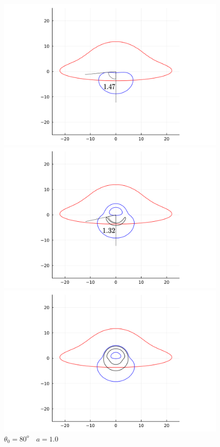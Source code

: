 \documentclass[dvipdfmx]{report} %
\begin{document}
\begin{figure}[H]
    \centering
    \begin{minipage}{0.49\textwidth}
        \centering
        \includegraphics[width=\textwidth]{./images//buch/80/80-0.5.png}
        \caption{$\theta_{0}=80^{o} \quad a=0.5$}
        \label{}
    \end{minipage}
    \begin{minipage}{0.49\textwidth}
        \centering
        \includegraphics[width=\textwidth]{./images//buch/80/80-1.0.png}
        \caption{$\theta_{0}=80^{o} \quad a=1.0$}
        \label{}
    \end{minipage}
    \begin{minipage}{0.49\textwidth}
        \centering
        \includegraphics[width=\textwidth]{./images//buch/80/80-1.5.png}

\end{minipage}
\end{figure}
\end{document}
